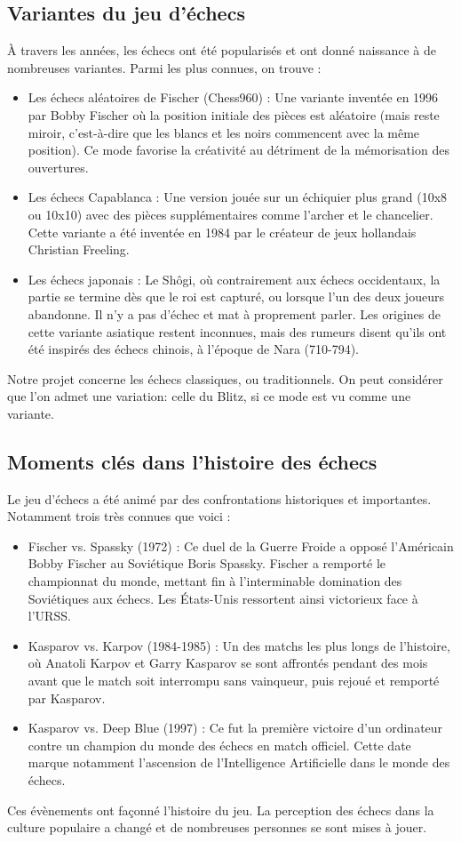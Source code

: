 \documentclass{article}
\begin{document}
\subsection{Variantes du jeu d'échecs}
À travers les années, les échecs ont été popularisés et ont donné naissance à de nombreuses variantes. Parmi les plus connues, on trouve :
\begin{itemize}
    \item Les échecs aléatoires de Fischer (Chess960) : Une variante inventée en 1996 par Bobby Fischer où la position initiale des pièces est aléatoire
    (mais reste miroir, c'est-à-dire que les blancs et les noirs commencent avec la même position). Ce mode favorise la créativité au détriment de la mémorisation des ouvertures.
    \item Les échecs Capablanca : Une version jouée sur un échiquier plus grand (10x8 ou 10x10) avec des pièces supplémentaires comme l'archer et le chancelier. Cette variante a été inventée en 1984 par le créateur de jeux hollandais Christian Freeling.
    \item Les échecs japonais : Le Shôgi, où contrairement aux échecs occidentaux, la partie se termine dès que le roi est capturé, ou lorsque l'un
    des deux joueurs abandonne. Il n'y a pas d'échec et mat à proprement parler. Les origines de cette variante asiatique restent inconnues,
    mais des rumeurs disent qu'ils ont été inspirés des échecs chinois, à l'époque de Nara (710-794).
\end{itemize}
Notre projet concerne les échecs classiques, ou traditionnels. On peut considérer que l'on admet une variation: celle du Blitz, si ce mode
est vu comme une variante.

\subsection{Moments clés dans l’histoire des échecs}
Le jeu d’échecs a été animé par des confrontations historiques et importantes. Notamment trois très connues que voici :
\begin{itemize}
    \item Fischer vs. Spassky (1972) : Ce duel de la Guerre Froide a opposé l’Américain Bobby Fischer au Soviétique
    Boris Spassky. Fischer a remporté le championnat du monde, mettant fin à l'interminable domination des Soviétiques
    aux échecs. Les États-Unis ressortent ainsi victorieux face à l'URSS.
    \item Kasparov vs. Karpov (1984-1985) : Un des matchs les plus longs de l’histoire, où Anatoli Karpov et Garry Kasparov
    se sont affrontés pendant des mois avant que le match soit interrompu sans vainqueur, puis rejoué et remporté par Kasparov.
    \item Kasparov vs. Deep Blue (1997) : Ce fut la première victoire d'un ordinateur contre un champion du monde des échecs en match officiel.
    Cette date marque notamment l'ascension de l'Intelligence Artificielle dans le monde des échecs.
\end{itemize}
Ces évènements ont façonné l’histoire du jeu. La perception des échecs dans la culture populaire a changé et de nombreuses
personnes se sont mises à jouer.
\end{document}
